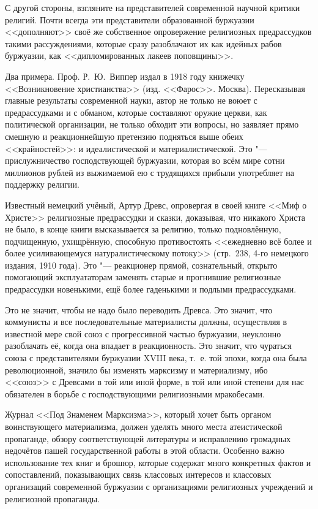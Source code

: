 С другой стороны, взгляните на представителей современной научной критики
религий. Почти всегда эти представители образованной буржуазии <<дополняют>>
своё же собственное опровержение религиозных предрассудков такими
рассуждениями, которые сразу разоблачают их как идейных рабов буржуазии,
как <<дипломированных лакеев поповщины>>.

Два примера. Проф. Р.~Ю.~Виппер издал в 1918 году книжечку <<Возникновение
христианства>> (изд. <<Фарос>>. Москва). Пересказывая главные результаты
современной науки, автор не только не воюет с предрассудками и с обманом,
которые составляют оружие церкви, как политической организации, не только
обходит эти вопросы, но заявляет прямо смешную и реакционнейшую претензию
подняться выше обеих <<крайностей>>: и идеалистической и
материалистической. Это "--- прислужничество господствующей буржуазии,
которая во всём мире сотни миллионов рублей из выжимаемой ею с трудящихся
прибыли употребляет на поддержку религии.

Известный немецкий учёный, Артур Древс, опровергая в своей книге <<Миф о
Христе>> религиозные предрассудки и сказки, доказывая, что никакого Христа
не было, в конце книги высказывается за религию, только подновлённую,
подчищенную, ухищрённую, способную противостоять <<ежедневно всё более и
более усиливающемуся натуралистическому потоку>> (стр.~238, 4-го немецкого
издания, 1910 года). Это "--- реакционер прямой, сознательный, открыто
помогающий эксплуататорам заменять старые и прогнившие религиозные
предрассудки новенькими, ещё более гаденькими и подлыми предрассудками.

Это не значит, чтобы не надо было переводить Древса. Это значит, что
коммунисты и все последовательные материалисты должны, осуществляя в
известной мере свой союз с прогрессивной частью буржуазии, неуклонно
разоблачать её, когда она впадает в реакционность. Это значит, что чураться
союза с представителями буржуазии XVIII века, т.~е. той эпохи, когда она
была революционной, значило бы изменять марксизму и материализму, ибо
<<союз>> с Древсами в той или иной форме, в той или иной степени для нас
обязателен в борьбе с господствующими религиозными мракобесами.

Журнал <<Под Знаменем Марксизма>>, который хочет быть органом воинствующего
материализма, должен уделять много места атеистической пропаганде, обзору
соответствующей литературы и исправлению громадных недочётов пашей
государственной работы в этой области. Особенно важно использование тех
книг и брошюр, которые содержат много конкретных фактов и сопоставлений,
показывающих связь классовых интересов и классовых организаций современной
буржуазии с организациями религиозных учреждений и религиозной
пропаганды.

